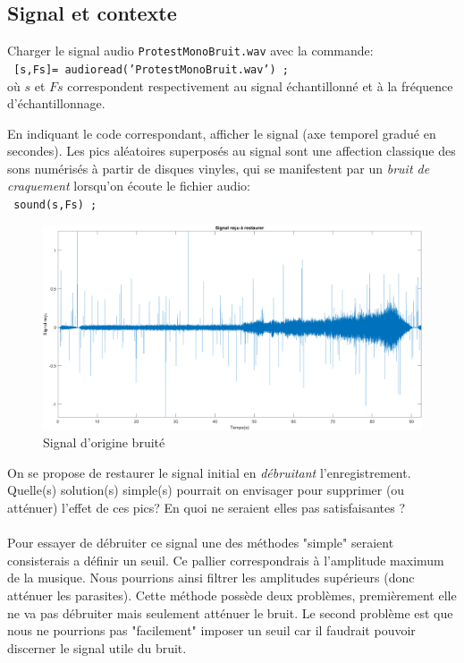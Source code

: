 \documentclass{article}
\begin{document}
\subsection{Signal et contexte}
Charger le signal audio {\tt ProtestMonoBruit.wav} avec la commande:\\[1mm]
{\tt
[s,Fs]= audioread('ProtestMonoBruit.wav') ;\\[1mm]
}
où $s$ et $Fs$ correspondent respectivement au signal échantillonné et à la fréquence d'échantillonnage.

En indiquant le code correspondant, afficher le signal (axe temporel gradué en secondes). Les pics aléatoires superposés au signal sont une affection classique des sons numérisés à partir de disques vinyles, qui se manifestent par un  \textit{bruit de craquement} lorsqu'on écoute le fichier audio:\\[1mm]
{\tt
sound(s,Fs) ;\\[2mm]
}
\begin{figure}[!h] 	
    \centering
    \includegraphics[width=1\textwidth]{images/signalorigine.png}
    \caption{Signal d'origine bruité}
    \label{fig-binaire}
\end{figure}

On se propose de restaurer le signal initial en {\em débruitant} l'enregistrement.\\
Quelle(s) solution(s) simple(s) pourrait on envisager pour supprimer (ou atténuer) l'effet de ces pics? En quoi ne seraient elles pas satisfaisantes ?\\ 
\\
Pour essayer de débruiter ce signal une des méthodes "simple" seraient  consisterais a définir un seuil. Ce pallier correspondrais à  l'amplitude maximum de la musique. Nous pourrions ainsi filtrer les amplitudes supérieurs (donc atténuer les parasites). Cette méthode possède deux problèmes, premièrement elle ne va pas débruiter mais seulement atténuer le bruit. Le second problème est que nous ne pourrions pas "facilement" imposer un seuil car il faudrait pouvoir discerner le signal utile du bruit. \newline
\end{document}
